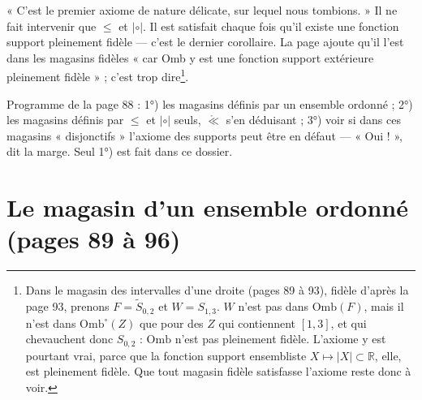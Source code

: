 \documentclass[11pt,a4paper]{article}
\begin{document}
« C'est le premier axiome de nature délicate, sur lequel nous tombions. » Il
ne fait intervenir que $\leq$ et $\mathrel{|\circ|}$. Il est satisfait chaque
fois qu'il existe une fonction support pleinement fidèle --- c'est le dernier
corollaire. La page ajoute qu'il l'est dans les magasins fidèles « car Omb y est
une fonction support extérieure pleinement fidèle » ; c'est trop
dire\footnote{Dans le magasin des intervalles d'une droite (pages 89 à 93),
fidèle d'après la page 93, prenons $F = \widetilde{S}_{0,2}$ et $W = S_{1,3}$.
$W$ n'est pas dans $\mathrm{Omb}(F)$, mais il n'est dans
$\mathrm{Omb}^{\circ}(Z)$ que pour des $Z$ qui contiennent $[1,3]$, et qui
chevauchent donc $S_{0,2}$ : $\mathrm{Omb}$ n'est pas pleinement fidèle.
L'axiome y est pourtant vrai, parce que la fonction support ensembliste $X
\mapsto |X| \subset \mathbb{R}$, elle, est pleinement fidèle. Que tout magasin
fidèle satisfasse l'axiome reste donc à voir.}.

Programme de la page 88 : 1°) les magasins définis par un ensemble ordonné ;
2°) les magasins définis par $\leq$ et $\mathrel{|\circ|}$ seuls,
$\mathring{\ll}$ s'en déduisant ; 3°) voir si dans ces magasins
« disjonctifs » l'axiome des supports peut être en défaut --- « Oui ! », dit la
marge. Seul 1°) est fait dans ce dossier.

\section*{Le magasin d'un ensemble ordonné (pages 89 à 96)}
\end{document}
